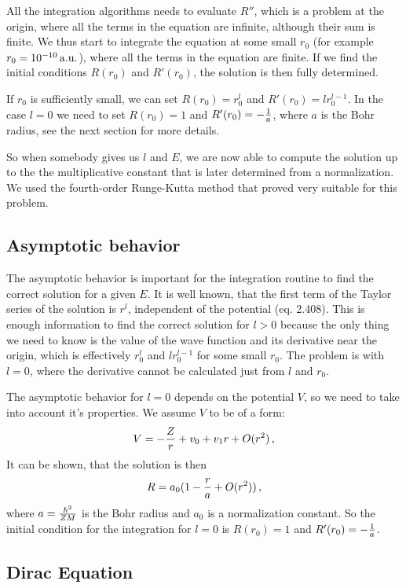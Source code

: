 All the integration algorithms needs to evaluate $R''$, which is a problem at the origin, where all the terms in the equation are infinite, although their sum is finite. We thus start to integrate the equation at some small $r_0$ (for example $r_0=10^{-10}\rm\,a.u.$), where all the terms in the equation are finite. If we find the initial conditions $R(r_0)$ and $R'(r_0)$, the solution is then fully determined.

If $r_0$ is sufficiently small, we can set $R(r_0)=r_0^l$ and $R'(r_0)=lr_0^{l-1}$. In the case $l=0$ we need to set $R(r_0)=1$ and $R'(r_0)=-{1\over a}$, where $a$ is the Bohr radius, see the next section for more details.

So when somebody gives us $l$ and $E$, we are now able to compute the solution
up to the the multiplicative constant that is later determined from a
normalization. We used the fourth-order Runge-Kutta
method that proved very suitable for this problem.

\subsection{Asymptotic behavior}

The asymptotic behavior is important for the integration routine to find the correct solution for a given $E$. It is well known, that the first term of the Taylor series of the solution is $r^l$, independent of the potential \cite{formanek} (eq. 2.408). This is enough information to find the correct solution for $l>0$ because the only thing we need to know is the value of the wave function and its derivative near the origin, which is effectively $r_0^l$ and $lr_0^{l-1}$ for some small $r_0$. The problem is with $l=0$, where the derivative cannot be calculated just from $l$ and $r_0$.

The asymptotic behavior for $l=0$ depends on the potential $V$, so we need to take into account it's properties. We assume $V$ to be of a form: 
\begin{equation*}
  V=-{Z\over r}+v_0 + v_1r + O(r^2)\,,
\end{equation*}
It can be shown, that the solution is then 
\begin{equation*}
  R=a_0(1-{r\over a}+O(r^2))\,,
\end{equation*}
where $a={\hbar^2\over ZM}$ is the Bohr radius and $a_0$ is a normalization constant. So the initial condition for the integration for $l=0$ is $R(r_0)=1$ and $R'(r_0)=-{1\over a}$.

\subsection{Dirac Equation}

